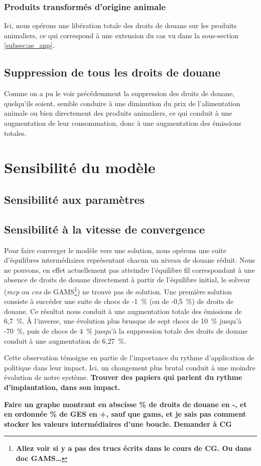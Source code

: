 \subsubsection{Produits transformés d'origine animale}

Ici, nous opérons une libération totale des droits de douane sur les produits animaliers, ce qui correspond à une extension du cas vu dans la sous-section \ref{subsec:ae_anp}.


\subsection{Suppression de tous les droits de douane}

Comme on a pu le voir précédemment la suppression des droits de douane, quelqu'ils soient, semble conduire à une diminution du prix de l'alimentation animale ou bien directement des produits animaliers, ce qui conduit à une augmentation de leur consommation, donc à une augmentation des émissions totales.


\section{Sensibilité du modèle}

\subsection{Sensibilité aux paramètres}

\subsection{Sensibilité à la vitesse de convergence}\label{subsec:vit_cvg}

Pour faire converger le modèle vers une solution, nous opérons une suite d'équilibres intermédiaires représentant chacun un niveau de douane réduit. Nous ne pouvons, en effet actuellement pas atteindre l'équilibre fil correspondant à une absence de droits de douane directement à partir de l'équilibre initial, le solveur (\textit{mcp} ou \textit{cns} de GAMS\footnote{\textbf{Allez voir si y a pas des trucs écrits dans le cours de CG. Ou dans doc GAMS\dots}}) ne trouve pas de solution. Une première solution consiste à succéder une suite de chocs de -1~\% (ou de -0,5~\%) de droits de douane. Ce résultat nous conduit à une augmentation totale des émissions de 6,7~\%. À l'inverse, une évolution plus brusque de sept chocs de 10~\% jusqu'à -70~\%, puis de chocs de 4~\% jusqu'à la suppression totale des droits de douane conduit à une augmentation de 6,27~\%.

Cette observation témoigne en partie de l'importance du rythme d'application de politique dans leur impact. Ici, un changement plus brutal conduit à une moindre évolution de notre système. \textbf{Trouver des papiers qui parlent du rythme d'implantation, dans son impact.}

\textbf{Faire un graphe montrant en abscisse \% de droits de douane en -, et en ordonnée \% de GES en +, sauf que gams, et je sais pas comment stocker les valeurs intermédiaires d'une boucle. Demander à CG}
